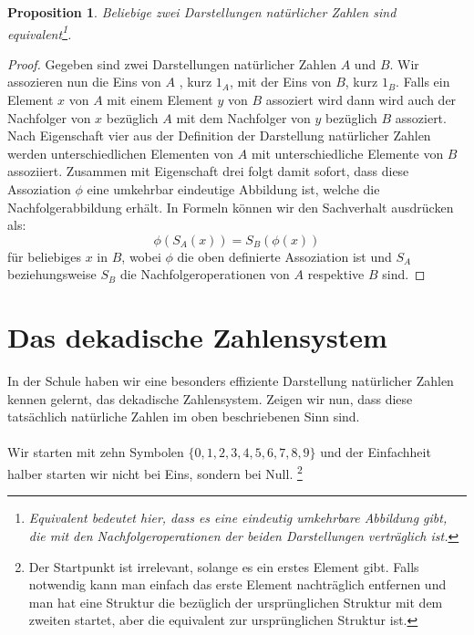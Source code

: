 \documentclass[11pt,a4paper,leqno]{report}
\newtheorem{proposition}{Proposition}[chapter]
\numberwithin{equation}{chapter}
\begin{document}
\begin{proposition}
	Beliebige zwei Darstellungen nat\"urlicher Zahlen sind\\ equivalent\footnote{Equivalent bedeutet hier, dass es eine eindeutig umkehrbare Abbildung gibt, die mit den Nachfolgeroperationen der beiden Darstellungen vertr\"aglich ist.}.
\end{proposition}
\begin{proof}
	Gegeben sind zwei Darstellungen nat\"urlicher Zahlen $A$ und $B$. Wir assozieren nun die Eins von $A$ , kurz $1_A$, mit der Eins von $B$, kurz $1_B$. Falls ein Element $x$ von $A$ mit einem Element $y$ von $B$ assoziert wird dann wird auch der Nachfolger von $x$ bez\"uglich $A$ mit dem Nachfolger von $y$ bez\"uglich $B$ assoziert. 
	Nach Eigenschaft vier aus der Definition der Darstellung nat\"urlicher Zahlen werden unterschiedlichen Elementen von $A$ mit unterschiedliche Elemente von $B$ assoziiert.
	Zusammen mit Eigenschaft drei folgt damit sofort, dass diese Assoziation $\phi$ eine umkehrbar eindeutige Abbildung ist, welche die Nachfolgerabbildung erh\"alt. In Formeln k\"onnen wir den Sachverhalt ausdr\"ucken als:
	$$\phi(S_A(x)) = S_B(\phi(x))$$ f\"ur beliebiges $x$ in $B$, wobei $\phi$ die oben definierte Assoziation ist und $S_A$ beziehungsweise $S_B$ die Nachfolgeroperationen von $A$ respektive $B$ sind.
\end{proof}
\section{Das dekadische Zahlensystem}
In der Schule haben wir eine besonders effiziente Darstellung nat\"urlicher Zahlen kennen gelernt, das dekadische Zahlensystem. Zeigen wir nun, dass diese tats\"achlich nat\"urliche Zahlen im oben beschriebenen Sinn sind.\\
\\
Wir starten mit zehn Symbolen $\{0, 1, 2, 3, 4, 5, 6, 7, 8, 9\}$ und der Einfachheit halber starten wir nicht bei Eins, sondern bei Null. \footnote{Der Startpunkt ist irrelevant, solange es ein erstes Element gibt. Falls notwendig kann man einfach das erste Element nachtr\"aglich entfernen und man hat eine Struktur die bez\"uglich der urspr\"unglichen Struktur mit dem zweiten startet, aber die equivalent zur urspr\"unglichen Struktur ist.}
 
\end{document}
